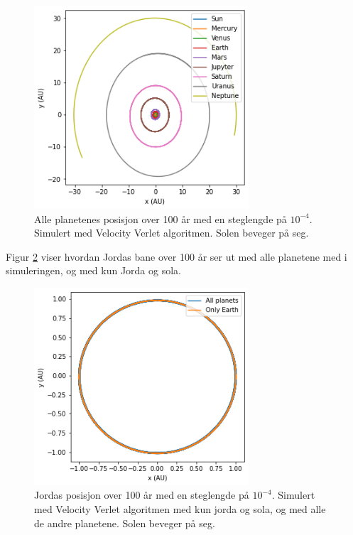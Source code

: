 \documentclass[reprint,english,notitlepage]{revtex4-1}
\begin{document}
	\begin{figure}[H]
		\includegraphics[width=80mm]{../../Code/Figures/all.png}
		\caption{Alle planetenes posisjon over 100 år med en steglengde på $10^{-4}$. Simulert med Velocity Verlet algoritmen. Solen beveger på seg.}
		\label{fig:all}
	\end{figure}

	Figur \ref{fig:100years} viser hvordan Jordas bane over 100 år ser ut med alle planetene med i simuleringen, og med kun Jorda og sola.

	\begin{figure}[H]
		\includegraphics[width=80mm]{../../Code/Figures/100years.png}
		\caption{Jordas posisjon over 100 år med en steglengde på $10^{-4}$. Simulert med Velocity Verlet algoritmen med kun jorda og sola, og med alle de andre planetene. Solen beveger på seg.}
		\label{fig:100years}
	\end{figure}
\end{document}
